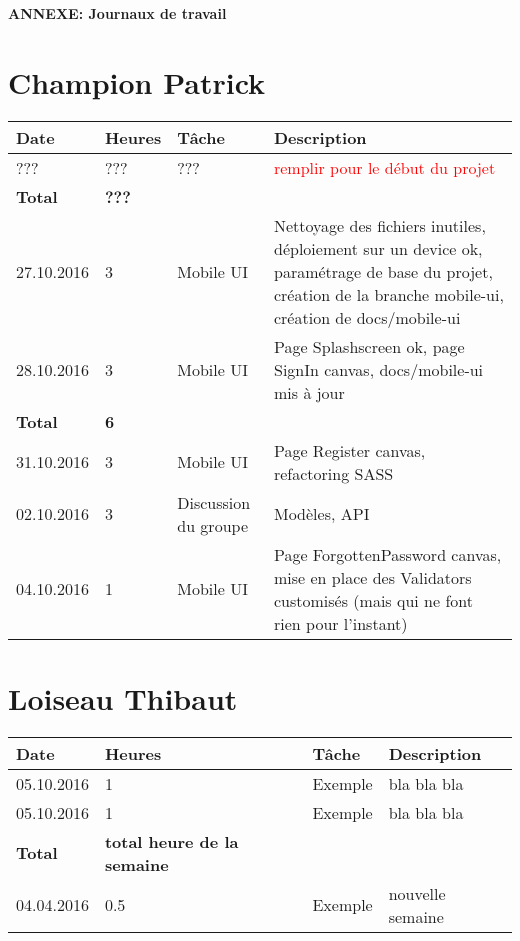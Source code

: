 \documentclass[french]{article}
\begin{document}
	\centering
	\large{\textbf{ANNEXE: Journaux de travail}}
	
	\justify
	
	\section*{Champion Patrick}
	\begin{longtable}{p{}|p{}|p{}|p{}}
		Date&Heures&Tâche&Description\\
		\hline \hline
		??? & ??? & ??? & \textcolor{red}{remplir pour le début du projet}\\
		\textbf{Total} & \textbf{???} &&\\
		\hline
		27.10.2016 & 3 & Mobile UI & Nettoyage des fichiers inutiles, déploiement sur un device ok, paramétrage de base du projet, création de la branche mobile-ui, création de docs/mobile-ui\\
		28.10.2016 & 3 & Mobile UI & Page Splashscreen ok, page SignIn canvas, docs/mobile-ui mis à jour\\
		\textbf{Total} & \textbf{6} &&\\
		\hline
		31.10.2016 & 3 & Mobile UI & Page Register canvas, refactoring SASS\\
		02.10.2016 & 3 & Discussion du groupe & Modèles, API\\
		04.10.2016 & 1 & Mobile UI & Page ForgottenPassword canvas, mise en place des Validators customisés (mais qui ne font rien pour l'instant)\\
	\end{longtable}

	\section*{Loiseau Thibaut}
	\begin{longtable}{p{}|p{}|p{}|p{}}
		Date&Heures&Tâche&Description\\
		\hline \hline
		05.10.2016 & 1 & Exemple & bla bla bla\\
		05.10.2016 & 1 & Exemple & bla bla bla\\
		\textbf{Total} & \textbf{total heure de la semaine} &&\\
		\hline
		04.04.2016 & 0.5 & Exemple & nouvelle semaine \\
	\end{longtable}
	
\end{document}

